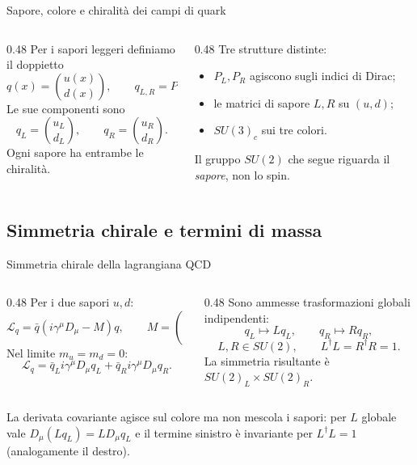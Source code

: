 \begin{frame}{Sapore, colore e chiralità dei campi di quark}
\small
\begin{columns}[T,onlytextwidth]
\begin{column}{0.48\textwidth}
Per i sapori leggeri definiamo il doppietto
\[
 q(x)=\binom{u(x)}{d(x)},\qquad
 q_{L,R}=P_{L,R}q.
\]
Le sue componenti sono
\[
 q_L=\binom{u_L}{d_L},\qquad
 q_R=\binom{u_R}{d_R}.
\]
Ogni sapore ha entrambe le chiralità.
\end{column}
\begin{column}{0.48\textwidth}
Tre strutture distinte:
\begin{itemize}
\item $P_L,P_R$ agiscono sugli indici di Dirac;
\item le matrici di sapore $L,R$ su $(u,d)$;
\item $SU(3)_c$ sui tre colori.
\end{itemize}
Il gruppo $SU(2)$ che segue riguarda il \emph{sapore}, non lo spin.
\end{column}
\end{columns}
\end{frame}

\subsection{Simmetria chirale e termini di massa}

\begin{frame}{Simmetria chirale della lagrangiana QCD}
\small
\begin{columns}[T,onlytextwidth]
\begin{column}{0.48\textwidth}
Per i due sapori $u,d$:
\[
 \mathcal L_q=\bar q(i\gamma^\mu D_\mu-M)q,
 \qquad M=\begin{pmatrix}m_u&0\\0&m_d\end{pmatrix}.
\]
Nel limite $m_u=m_d=0$:
\[
 \mathcal L_q=\bar q_Li\gamma^\mu D_\mu q_L
 +\bar q_Ri\gamma^\mu D_\mu q_R.
\]
\end{column}
\begin{column}{0.48\textwidth}
Sono ammesse trasformazioni globali indipendenti:
\[
 q_L\mapsto Lq_L,\qquad q_R\mapsto Rq_R,
\]
\[
 L,R\in SU(2),\qquad
 L^\dagger L=R^\dagger R=1.
\]
La simmetria risultante è $SU(2)_L\times SU(2)_R$.
\end{column}
\end{columns}
\medskip
La derivata covariante agisce sul colore ma non mescola i sapori: per $L$ globale vale $D_\mu(Lq_L)=L D_\mu q_L$ e il termine sinistro è invariante per $L^\dagger L=1$ (analogamente il destro).
\end{frame}

